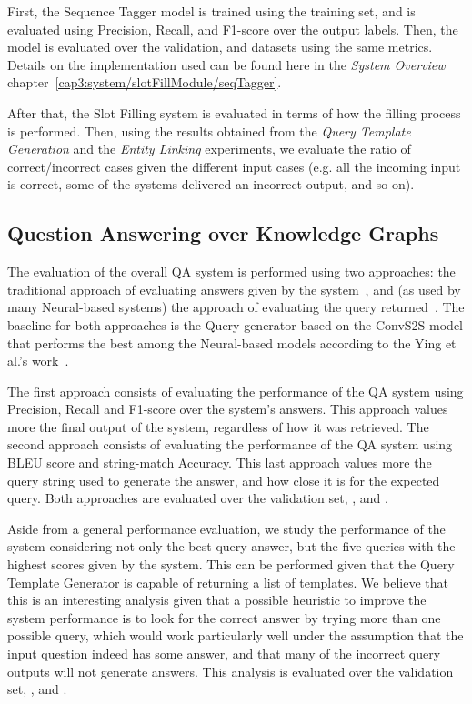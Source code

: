 First, the Sequence Tagger model is trained using the \LCQuADtwo{} training set, and is evaluated 
using Precision, Recall, and F1-score over the output labels. Then, the model is evaluated over 
the \LCQuADtwo{} validation, \QALDseven{} and \WikiSPARQL{} datasets using the same metrics. 
Details on the implementation used can be found here in the \textit{System Overview} 
chapter~\ref{cap3:system/slotFillModule/seqTagger}.

After that, the Slot Filling system is evaluated in terms of how the filling process is performed. 
Then, using the results obtained from the \textit{Query Template Generation} and the 
\textit{Entity Linking} experiments, we evaluate the ratio of correct/incorrect cases given the 
different input cases (e.g. all the incoming input is correct, some of the systems delivered an 
incorrect output, and so on).

\subsection{Question Answering over Knowledge Graphs}
\label{cap4:experimentalDesign/KGQA}
The evaluation of the overall QA system is performed using two approaches: the traditional 
approach of evaluating answers given by the system~\cite{qa:qald-Lopezetal2013}, and (as used by 
many Neural-based systems) the approach of evaluating the \SPARQL{} query 
returned~\cite{nmt:nl-to-sparql-Yin19}. The baseline for both approaches is the \SPARQL{} Query 
generator based on the ConvS2S model that performs the best among the Neural-based models 
according to the Ying et al.’s work~\cite{nmt:nl-to-sparql-Yin19}.

The first approach consists of evaluating the performance of the QA system using Precision, 
Recall and F1-score over the system’s answers. This approach values more the final output of the 
system, regardless of how it was retrieved. The second approach consists of evaluating the 
performance of the QA system using BLEU score and string-match Accuracy. This last approach 
values more the query string used to generate the answer, and how close it is for the expected 
query. Both approaches are evaluated over the \LCQuADtwo{} validation set, \QALDseven{}, and \WikiSPARQL{}.

Aside from a general performance evaluation, we study the performance of the system considering 
not only the best \SPARQL{} query answer, but the five \SPARQL{} queries with the highest scores given 
by the system. This can be performed given that the Query Template Generator is capable of 
returning a list of templates. We believe that this is an interesting analysis given that a 
possible heuristic to improve the system performance is to look for the correct answer by trying 
more than one possible \SPARQL{} query, which would work particularly well under the assumption 
that the input question indeed has some answer, and that many of the incorrect \SPARQL{} query 
outputs will not generate answers. This analysis is evaluated over the \LCQuADtwo{} validation set, 
\QALDseven{}, and \WikiSPARQL{}.

